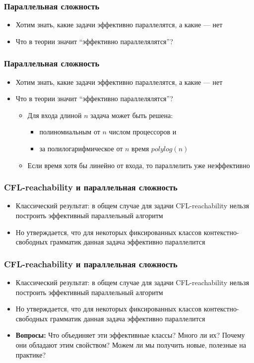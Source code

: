 \documentclass{beamer}
\begin{document}
\begin{frame}
\frametitle{Параллельная сложность}
\begin{itemize}
\item Хотим знать, какие задачи эффективно параллелятся, а какие --- нет
\item Что в теории значит ``эффективно параллелялятся''?
\end{itemize}
\end{frame}
\begin{frame}
\frametitle{Параллельная сложность}
\begin{itemize}
\item Хотим знать, какие задачи эффективно параллелятся, а какие --- нет
\item Что в теории значит ``эффективно параллелялятся''?
\begin{itemize}
\item Для входа длиной $n$ задача может быть решена:
\begin{itemize}
\item полиномиальным от $n$ числом процессоров и 
\item за полилогарифмическое от $n$ время $polylog(n)$
\end{itemize}
\item Если время хотя бы линейно от входа, то параллелить уже неэффективно
\end{itemize}
\end{itemize}
\end{frame}

\begin{frame}
\frametitle{CFL-reachability и параллельная сложность}
\begin{itemize}
\item Классический результат: в общем случае для задачи CFL-reachability нельзя построить эффективный параллельный алгоритм
\item Но утверждается, что для некоторых фиксированных классов контекстно-свободных грамматик данная задача эффективно параллелится
\end{itemize}
\end{frame}


\begin{frame}
\frametitle{CFL-reachability и параллельная сложность}
\begin{itemize}
\item Классический результат: в общем случае для задачи CFL-reachability нельзя построить эффективный параллельный алгоритм
\item Но утверждается, что для некоторых фиксированных классов контекстно-свободных грамматик данная задача эффективно параллелится
\item \textbf{Вопросы:} Что объединяет эти эффективные классы? Много ли их? Почему они обладают этим свойством? Можем ли мы получить новые, полезные на практике?
\end{itemize}
\end{frame}
\end{document}
